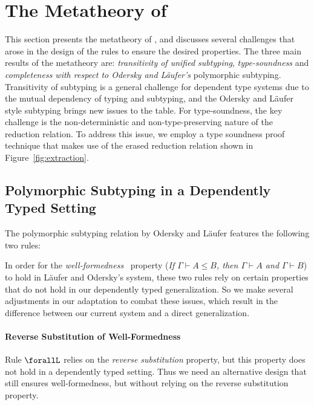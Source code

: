 \section{The Metatheory of \name}
\label{sec:metatheory}

This section presents the metatheory of \name, and discusses several challenges
that arose in the design of the rules to ensure the desired properties.
The three main results of the metatheory are:
\emph{transitivity of unified subtyping}, \emph{type-soundness} and
\emph{completeness with respect to Odersky and L\"aufer's} polymorphic
subtyping. Transitivity of subtyping is a general challenge for dependent type systems due
to the mutual dependency of typing and subtyping, and the Odersky and L\"aufer style
subtyping brings new issues to the table. For type-soundness, the key challenge
is the non-deterministic and non-type-preserving nature of the reduction relation.
To address this issue, we employ a type soundness proof technique
that makes use of the erased reduction relation shown in Figure~\ref{fig:extraction}.

\subsection{Polymorphic Subtyping in a Dependently Typed Setting}
\label{sec:adaptation}

The polymorphic subtyping relation by Odersky and L\"aufer features the following two rules:
In order for the \emph{well-formedness}~\cite{dunfield2013lemmas} property
(\emph{If $\Gamma \vdash A \le B$, then $\Gamma \vdash A$ and $\Gamma \vdash B$})
to hold in L\"aufer and Odersky's system, these two rules rely on certain properties
that do not hold in our dependently typed generalization. So we make several adjustments
in our adaptation to combat these issues, which result in the difference between
our current system and a direct generalization.

\paragraph*{Reverse Substitution of Well-Formedness}
\label{sec:reverse-subst}
Rule $\forallL$ relies on the \emph{reverse substitution} property, but this property
does not hold in a dependently typed setting. Thus we need an alternative design that
still ensures well-formedness, but without relying on the reverse substitution property.


